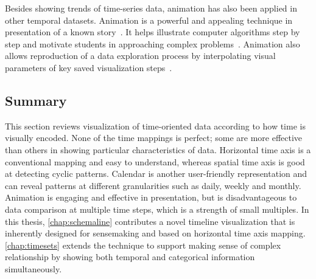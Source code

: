 Besides showing trends of time-series data, animation has also been applied in other temporal datasets. Animation is a powerful and appealing technique in presentation of a known story~\cite{Gershon2001}. It helps illustrate computer algorithms step by step and motivate students in approaching complex problems~\cite{Kehoe2001}. Animation also allows reproduction of a data exploration process by interpolating visual parameters of key saved visualization steps~\cite{Ma1999}.

\subsection{Summary}
This section reviews visualization of time-oriented data according to how time is visually encoded. None of the time mappings is perfect; some are more effective than others in showing particular characteristics of data. Horizontal time axis is a conventional mapping and easy to understand, whereas spatial time axis is good at detecting cyclic patterns. Calendar is another user-friendly representation and can reveal patterns at different granularities such as daily, weekly and monthly. Animation is engaging and effective in presentation, but is disadvantageous to data comparison at multiple time steps, which is a strength of small multiples. In this thesis, \autoref{chap:schemaline} contributes a novel timeline visualization that is inherently designed for sensemaking and based on horizontal time axis mapping. \autoref{chap:timesets} extends the technique to support making sense of complex relationship by showing both temporal and categorical information simultaneously.